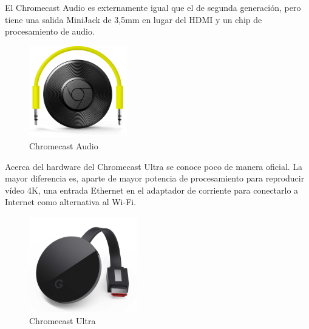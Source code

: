 El Chromecast Audio es externamente igual que el de segunda generación, pero tiene una salida MiniJack de 3,5mm en lugar del HDMI y un chip de procesamiento de audio.

\begin{figure}[h]
	\centering
	\includegraphics[width=0.38\textwidth]{./Imagenes/chromecastaudio.png}
	\caption{Chromecast Audio}\label{fig:audio}
\end{figure}

Acerca del hardware del Chromecast Ultra se conoce poco de manera oficial.
La mayor diferencia es, aparte de mayor potencia de procesamiento para reproducir vídeo 4K, una entrada Ethernet en el adaptador de corriente para conectarlo a Internet como alternativa al Wi-Fi.

\begin{figure}[h]
	\centering
	\includegraphics[width=0.42\textwidth]{./Imagenes/chromecast-ultra.jpg}
	\caption{Chromecast Ultra}\label{fig:ultra}
\end{figure}
